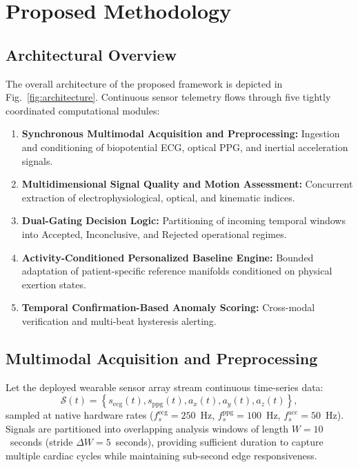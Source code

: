 \documentclass{ieeeaccess}
\begin{document}
\section{Proposed Methodology}
\label{sec:methodology}

\subsection{Architectural Overview}
The overall architecture of the proposed framework is depicted in Fig.~\ref{fig:architecture}. Continuous sensor telemetry flows through five tightly coordinated computational modules:
\begin{enumerate}
\item \textbf{Synchronous Multimodal Acquisition and Preprocessing:} Ingestion and conditioning of biopotential ECG, optical PPG, and inertial acceleration signals.
\item \textbf{Multidimensional Signal Quality and Motion Assessment:} Concurrent extraction of electrophysiological, optical, and kinematic indices.
\item \textbf{Dual-Gating Decision Logic:} Partitioning of incoming temporal windows into Accepted, Inconclusive, and Rejected operational regimes.
\item \textbf{Activity-Conditioned Personalized Baseline Engine:} Bounded adaptation of patient-specific reference manifolds conditioned on physical exertion states.
\item \textbf{Temporal Confirmation-Based Anomaly Scoring:} Cross-modal verification and multi-beat hysteresis alerting.
\end{enumerate}

\subsection{Multimodal Acquisition and Preprocessing}
Let the deployed wearable sensor array stream continuous time-series data:
\begin{equation}
\mathcal{S}(t) = \left\{ s_{\mathrm{ecg}}(t), s_{\mathrm{ppg}}(t), a_x(t), a_y(t), a_z(t) \right\},
\end{equation}
sampled at native hardware rates ($f_s^{\mathrm{ecg}} = 250$~Hz, $f_s^{\mathrm{ppg}} = 100$~Hz, $f_s^{\mathrm{acc}} = 50$~Hz). Signals are partitioned into overlapping analysis windows of length $W = 10$~seconds (stride $\Delta W = 5$~seconds), providing sufficient duration to capture multiple cardiac cycles while maintaining sub-second edge responsiveness.
\end{document}
